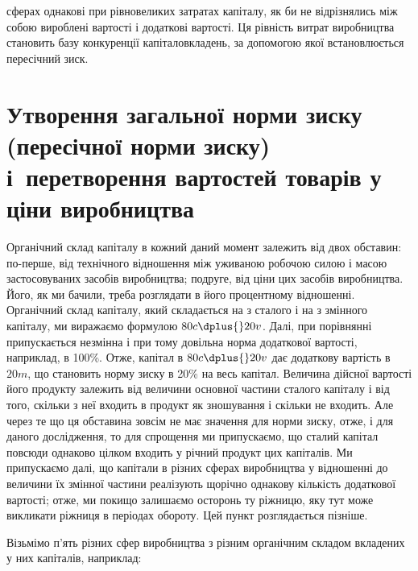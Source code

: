 \parcont{}  %
сферах однакові при рівновеликих затратах капіталу, як би не
відрізнялись між собою вироблені вартості і додаткові вартості.
Ця рівність витрат виробництва становить базу конкуренції капіталовкладень, за допомогою якої
встановлюється пересічний зиск.

\section{%
Утворення загальної норми зиску (пересічної норми зиску)
і~перетворення вартостей товарів у ціни виробництва}
%

Органічний склад капіталу в кожний даний момент залежить
від двох обставин: по-перше, від технічного відношення між уживаною робочою силою і масою
застосовуваних засобів виробництва; подруге, від ціни цих засобів виробництва. Його, як ми бачили,
треба розглядати в його процентному відношенні. Органічний склад капіталу, який складається на  з
сталого і на  з змінного капіталу, ми виражаємо формулою $80 c \dplus{} 20 v$. Далі, при
порівнянні припускається незмінна і при тому довільна норма
додаткової вартості, наприклад, в 100\%. Отже, капітал в $80 c \dplus{} 20 v$ дає додаткову вартість в $20 m$,
що становить норму зиску
в 20\% на весь капітал. Величина дійсної вартості його продукту
залежить від величини основної частини сталого капіталу і від
того, скільки з неї входить в продукт як зношування і скільки
не входить. Але через те що ця обставина зовсім не має значення для норми зиску, отже, і для даного
дослідження, то для
спрощення ми припускаємо, що сталий капітал повсюди однаково цілком входить у річний продукт цих
капіталів. Ми припускаємо далі, що капітали в різних сферах виробництва у
відношенні до величини їх змінної частини реалізують щорічно
однакову кількість додаткової вартості; отже, ми покищо залишаємо осторонь ту ріжницю, яку тут може
викликати ріжниця
в періодах обороту. Цей пункт розглядається пізніше.

Візьмімо п’ять різних сфер виробництва з різним органічним
складом вкладених у них капіталів, наприклад:

